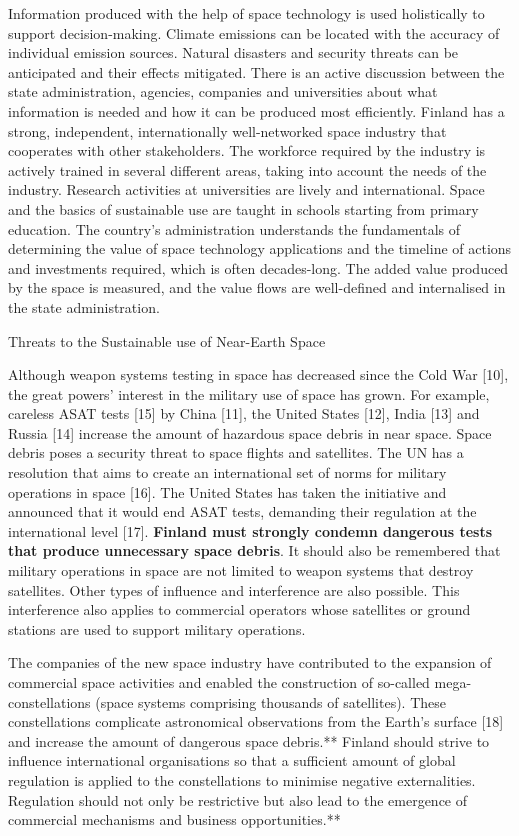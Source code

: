 Information produced with the help of space technology is used
holistically to support decision-making. Climate emissions can be
located with the accuracy of individual emission sources. Natural
disasters and security threats can be anticipated and their effects
mitigated. There is an active discussion between the state
administration, agencies, companies and universities about what
information is needed and how it can be produced most efficiently.
Finland has a strong, independent, internationally well-networked space
industry that cooperates with other stakeholders. The workforce required
by the industry is actively trained in several different areas, taking
into account the needs of the industry. Research activities at
universities are lively and international. Space and the basics of
sustainable use are taught in schools starting from primary education.
The country's administration understands the fundamentals of determining
the value of space technology applications and the timeline of actions
and investments required, which is often decades-long. The added value
produced by the space is measured, and the value flows are well-defined
and internalised in the state administration.

\protect\hypertarget{anchor-12}{}{}Threats to the Sustainable use of
Near-Earth Space

Although weapon systems testing in space has decreased since the Cold
War {[}10{]}, the great powers' interest in the military use of space
has grown. For example, careless ASAT tests {[}15{]} by China {[}11{]},
the United States {[}12{]}, India {[}13{]} and Russia {[}14{]} increase
the amount of hazardous space debris in near space. Space debris poses a
security threat to space flights and satellites. The UN has a resolution
that aims to create an international set of norms for military
operations in space {[}16{]}. The United States has taken the initiative
and announced that it would end ASAT tests, demanding their regulation
at the international level {[}17{]}. \textbf{Finland must strongly
condemn dangerous tests that produce unnecessary space debris}. It
should also be remembered that military operations in space are not
limited to weapon systems that destroy satellites. Other types of
influence and interference are also possible. This interference also
applies to commercial operators whose satellites or ground stations are
used to support military operations.

The companies of the new space industry have contributed to the
expansion of commercial space activities and enabled the construction of
so-called mega-constellations (space systems comprising thousands of
satellites). These constellations complicate astronomical observations
from the Earth's surface {[}18{]} and increase the amount of dangerous
space debris.** Finland should strive to influence international
organisations so that a sufficient amount of global regulation is
applied to the constellations to minimise negative externalities.
Regulation should not only be restrictive but also lead to the emergence
of commercial mechanisms and business opportunities.**

